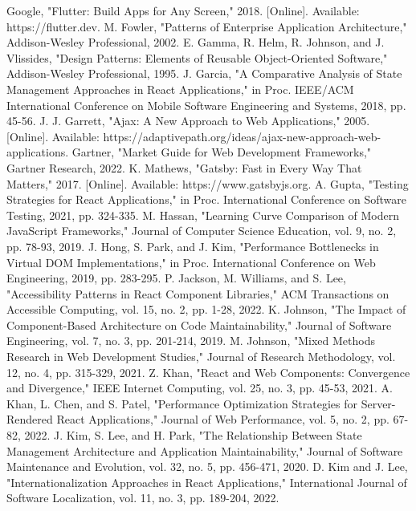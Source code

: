 \begin{thebibliography}{00}
 Google, "Flutter: Build Apps for Any Screen," 2018. [Online]. Available: https://flutter.dev.
 M. Fowler, "Patterns of Enterprise Application Architecture," Addison-Wesley Professional, 2002.
 E. Gamma, R. Helm, R. Johnson, and J. Vlissides, "Design Patterns: Elements of Reusable Object-Oriented Software," Addison-Wesley Professional, 1995.
 J. Garcia, "A Comparative Analysis of State Management Approaches in React Applications," in Proc. IEEE/ACM International Conference on Mobile Software Engineering and Systems, 2018, pp. 45-56.
 J. J. Garrett, "Ajax: A New Approach to Web Applications," 2005. [Online]. Available: https://adaptivepath.org/ideas/ajax-new-approach-web-applications.
 Gartner, "Market Guide for Web Development Frameworks," Gartner Research, 2022.
 K. Mathews, "Gatsby: Fast in Every Way That Matters," 2017. [Online]. Available: https://www.gatsbyjs.org.
 A. Gupta, "Testing Strategies for React Applications," in Proc. International Conference on Software Testing, 2021, pp. 324-335.
 M. Hassan, "Learning Curve Comparison of Modern JavaScript Frameworks," Journal of Computer Science Education, vol. 9, no. 2, pp. 78-93, 2019.
 J. Hong, S. Park, and J. Kim, "Performance Bottlenecks in Virtual DOM Implementations," in Proc. International Conference on Web Engineering, 2019, pp. 283-295.
 P. Jackson, M. Williams, and S. Lee, "Accessibility Patterns in React Component Libraries," ACM Transactions on Accessible Computing, vol. 15, no. 2, pp. 1-28, 2022.
 K. Johnson, "The Impact of Component-Based Architecture on Code Maintainability," Journal of Software Engineering, vol. 7, no. 3, pp. 201-214, 2019.
 M. Johnson, "Mixed Methods Research in Web Development Studies," Journal of Research Methodology, vol. 12, no. 4, pp. 315-329, 2021.
 Z. Khan, "React and Web Components: Convergence and Divergence," IEEE Internet Computing, vol. 25, no. 3, pp. 45-53, 2021.
 A. Khan, L. Chen, and S. Patel, "Performance Optimization Strategies for Server-Rendered React Applications," Journal of Web Performance, vol. 5, no. 2, pp. 67-82, 2022.
 J. Kim, S. Lee, and H. Park, "The Relationship Between State Management Architecture and Application Maintainability," Journal of Software Maintenance and Evolution, vol. 32, no. 5, pp. 456-471, 2020.
 D. Kim and J. Lee, "Internationalization Approaches in React Applications," International Journal of Software Localization, vol. 11, no. 3, pp. 189-204, 2022.

\end{thebibliography}
